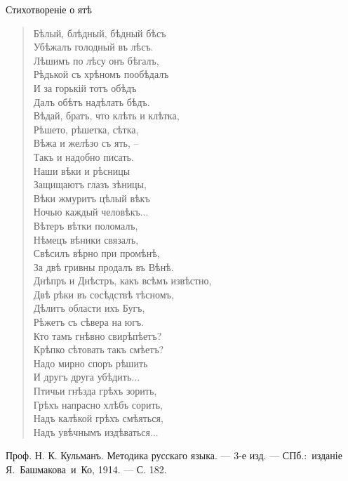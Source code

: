 \documentclass[12pt]{article}
\begin{document}
	\begin{center}
		Стихотвореніе о ятѣ 
	\end{center}
	\vfill
	\begin{flushleft}
		\begin{verse}
			Бѣлый, блѣдный, бѣдный бѣсъ \\
			Убѣжалъ голодный въ лѣсъ. \\
			Лѣшимъ по лѣсу онъ бѣгалъ, \\
			Рѣдькой съ хрѣномъ пообѣдалъ \\
			И за горькій тотъ обѣдъ \\
			Далъ обѣтъ надѣлать бѣдъ. \\
			Вѣдай, братъ, что клѣть и клѣтка, \\
			Рѣшето, рѣшетка, сѣтка, \\
			Вѣжа и желѣзо съ ять, -- \\
			Такъ и надобно писать. \\
			Наши вѣки и рѣсницы \\
			Защищаютъ глазъ зѣницы, \\
			Вѣки жмуритъ цѣлый вѣкъ \\
			Ночью каждый человѣкъ... \\
			Вѣтеръ вѣтки поломалъ, \\
			Нѣмецъ вѣники связалъ, \\
			Свѣсилъ вѣрно при промѣнѣ, \\
			За двѣ гривны продалъ въ Вѣнѣ. \\
			Днѣпръ и Днѣстръ, какъ всѣмъ извѣстно, \\
			Двѣ рѣки въ сосѣдствѣ тѣсномъ, \\
			Дѣлитъ области ихъ Бугъ, \\
			Рѣжетъ съ сѣвера на югъ. \\
			Кто тамъ гнѣвно свирѣпѣетъ? \\
			Крѣпко сѣтовать такъ смѣетъ? \\
			Надо мирно споръ рѣшить \\
			И другъ друга убѣдить... \\
			Птичьи гнѣзда грѣхъ зорить, \\
			Грѣхъ напрасно хлѣбъ сорить, \\
			Надъ калѣкой грѣхъ смѣяться, \\
			Надъ увѣчнымъ издѣваться...
		\end{verse}
	\end{flushleft}
	\vfill
	\begin{flushleft}
		Проф. Н. К. Кульманъ. Методика русскаго языка. — 3-е изд. — СПб.:~изданіе Я.~Башмакова~и~Ко, 1914. — С. 182.
	\end{flushleft}
\end{document}

